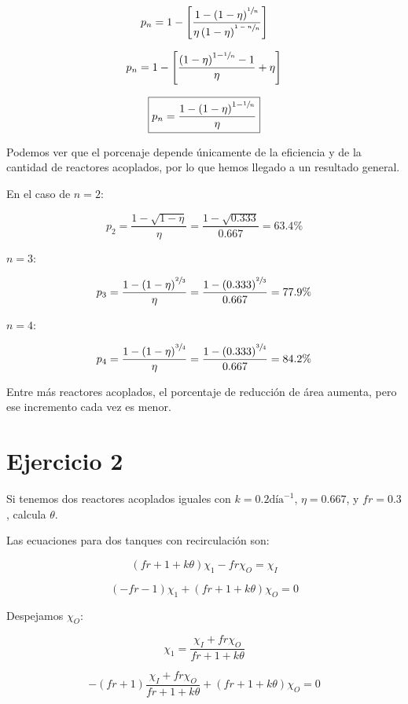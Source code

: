 \documentclass[11pt]{article}
\begin{document}
\[ p_n = 1 - \left[ \frac{ 1 - \left( 1 - \eta \right) ^ { \sfrac{1}{n} } }{ \eta \left( 1 - \eta \right)  ^ { \sfrac{ 1 - n }{n} } } \right] \]

\[ p_n = 1 - \left[ \frac{ \left( 1 - \eta \right) ^ { 1 - \sfrac{1}{n} } - 1 }{ \eta } + \eta \right] \]

\[ \boxed{ p_n = \frac{ 1 - \left( 1 - \eta \right) ^ { 1 - \sfrac{1}{n} } }{ \eta } } \]

Podemos ver que el porcenaje depende únicamente de la eficiencia y de la cantidad de reactores acoplados, por lo que hemos llegado a un resultado general.

En el caso de \( n = 2 \):

\[ p_2 = \frac{ 1 - \sqrt{ 1 - \eta } }{ \eta } = \frac{ 1 - \sqrt{ 0.333 } }{ 0.667 } = 63.4 \% \]


\( n = 3 \):

\[ p_3 = \frac{ 1 - \left( 1 - \eta \right) ^ { \sfrac{2}{3} } }{ \eta } = \frac{ 1 - \left( 0.333 \right) ^ { \sfrac{2}{3} } }{ 0.667 } = 77.9 \% \]

\( n = 4 \):

\[ p_4 = \frac{ 1 - \left( 1 - \eta \right) ^ { \sfrac{3}{4} } }{ \eta } = \frac{ 1 - \left( 0.333 \right) ^ { \sfrac{3}{4} } }{ 0.667 } = 84.2 \% \]

Entre más reactores acoplados, el porcentaje de reducción de área aumenta, pero ese incremento cada vez es menor.

\section{Ejercicio 2}

Si tenemos dos reactores acoplados iguales con \( k = 0.2 \text{día}^{-1}\), \( \eta = 0.667 \), y \( fr = 0.3 \), calcula \( \theta \).

\bigskip \bigskip

Las ecuaciones para dos tanques con recirculación son: 

\[ \left( fr + 1 + k \theta \right) \chi_1 - fr \chi_O = \chi_I  \]

\[ \left( - fr - 1 \right) \chi_1 + \left( fr + 1 + k \theta \right) \chi_O = 0 \]

Despejamos \( \chi_O \):

\[ \chi_1 = \frac{ \chi_I + fr \chi_O }{ fr + 1 + k \theta } \]

\[ - \left( fr + 1 \right) \frac{ \chi_I + fr \chi_O }{ fr + 1 + k \theta } + \left( fr + 1 + k \theta \right) \chi_O = 0 \]
\end{document}
